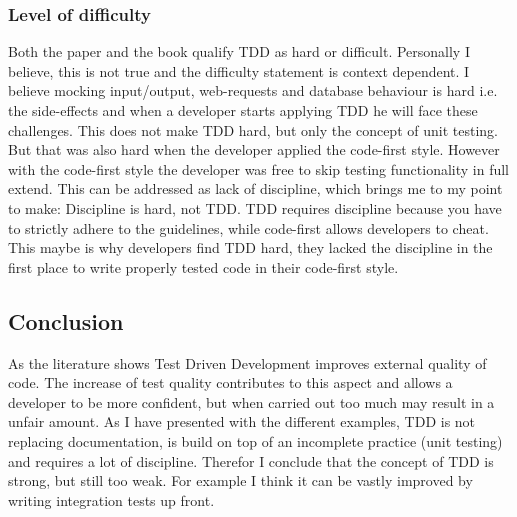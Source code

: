 \subsubsection*{Level of difficulty}

Both the paper and the book qualify TDD as hard or difficult. Personally I believe, this is not true and the
difficulty statement is context dependent. I believe mocking input/output, web-requests and database behaviour is hard
i.e. the side-effects and when a developer starts applying TDD he will face these challenges. This does not make TDD hard,
but only the concept of unit testing. But that was also hard when the developer applied the code-first style. However
with the code-first style the developer was free to skip testing functionality in full extend. This can be addressed as lack of
discipline, which brings me to my point to make: Discipline is hard, not TDD. TDD requires discipline because you have to strictly adhere to the guidelines,
while code-first allows developers to cheat. This maybe is why developers find TDD hard, they lacked the discipline in the
first place to write properly tested code in their code-first style.

\subsection*{Conclusion}

As the literature shows Test Driven Development improves external quality of code. The increase of test quality
contributes to this aspect and allows a developer to be more confident, but when carried out too much may result in a
unfair amount. As I have presented with the different examples, TDD is not replacing documentation, is build on top of
an incomplete practice (unit testing) and requires a lot of discipline. Therefor I conclude that the concept of TDD is
strong, but still too weak. For example I think it can be vastly improved by writing integration tests up front.
